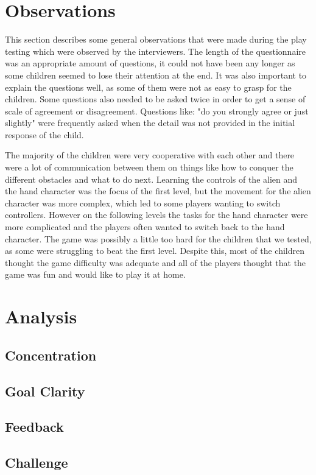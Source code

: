 \section{Observations}
This section describes some general observations that were made during the play testing which were observed by the interviewers. The length of the questionnaire was an appropriate amount of questions, it could not have been any longer as some children seemed to lose their attention at the end. It was also important to explain the questions well, as some of them were not as easy to grasp for the children. Some questions also needed to be asked twice in order to get a sense of scale of agreement or disagreement. Questions like: "do you strongly agree or just slightly" were frequently asked when the detail was not provided in the initial response of the child. 

The majority of the children were very cooperative with each other and there were a lot of communication between them on things like how to conquer the different obstacles and what to do next. Learning the controls of the alien and the hand character was the focus of the first level, but the movement for the alien character was more complex, which led to some players wanting to switch controllers. However on the following levels the tasks for the hand character were more complicated and the players often wanted to switch back to the hand character. The game was possibly a little too hard for the children that we tested, as some were struggling to beat the first level.  Despite this, most of the children thought the game difficulty was adequate and all of the players thought that the game was fun and would like to play it at home.


\section{Analysis}
\subsection{Concentration}
\subsection{Goal Clarity}
\subsection{Feedback}
\subsection{Challenge}
